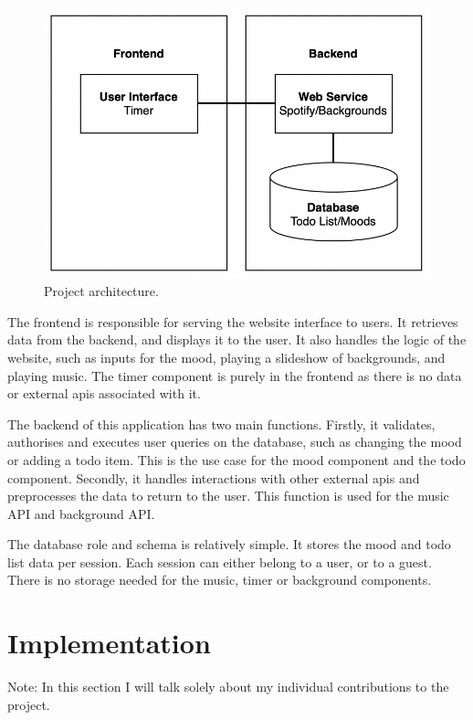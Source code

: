 \documentclass[conference]{IEEEtran}
\begin{document}
\begin{figure}[htbp]
\centerline{\includegraphics[width = \linewidth]{project-architecture.png}}
\caption{Project architecture.}
\label{project-architecture}
\end{figure}

The frontend is responsible for serving the website interface to users. It retrieves data from the backend, and displays it to the user. It also handles the logic of the website, such as inputs for the mood, playing a slideshow of backgrounds, and playing music. The timer component is purely in the frontend as there is no data or external apis associated with it.

The backend of this application has two main functions. Firstly, it validates, authorises and executes user queries on the database, such as changing the mood or adding a todo item. This is the use case for the mood component and the todo component. Secondly, it handles interactions with other external apis and preprocesses the data to return to the user. This function is used for the music API and background API.

The database role and schema is relatively simple. It stores the mood and todo list data per session. Each session can either belong to a user, or to a guest. There is no storage needed for the music, timer or background components.


\section{Implementation}
Note: In this section I will talk solely about my individual contributions to the project.
\end{document}
